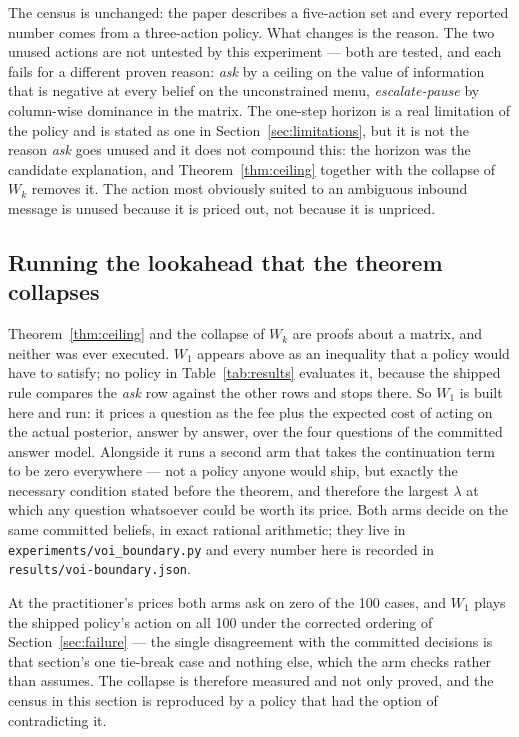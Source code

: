 \documentclass{article}
\begin{document}
The census is unchanged: the paper describes a five-action set and every reported
number comes from a three-action policy. What changes is the reason. The two unused
actions are not untested by this experiment --- both are tested, and each fails for
a different proven reason: \emph{ask} by a ceiling on the value of information that
is negative at every belief on the unconstrained menu, \emph{escalate-pause} by
column-wise dominance in the matrix. The one-step horizon is a real limitation of
the policy and is stated as one in Section~\ref{sec:limitations}, but it is not the
reason \emph{ask} goes unused and it does not compound this: the horizon was the
candidate explanation, and Theorem~\ref{thm:ceiling} together with the collapse of
$W_k$ removes it. The action most obviously suited to an ambiguous inbound message
is unused because it is priced out, not because it is unpriced.

\subsection{Running the lookahead that the theorem collapses}
\label{sec:boundary}
Theorem~\ref{thm:ceiling} and the collapse of $W_k$ are proofs about a matrix, and
neither was ever executed. $W_1$ appears above as an inequality that a policy would
have to satisfy; no policy in Table~\ref{tab:results} evaluates it, because the
shipped rule compares the \emph{ask} row against the other rows and stops there. So
$W_1$ is built here and run: it prices a question as the fee plus the expected cost
of acting on the actual posterior, answer by answer, over the four questions of the
committed answer model. Alongside it runs a second arm that takes the continuation
term to be zero everywhere --- not a policy anyone would ship, but exactly the
necessary condition stated before the theorem, and therefore the largest $\lambda$ at
which any question whatsoever could be worth its price. Both arms decide on the same
committed beliefs, in exact rational arithmetic; they live in
\texttt{experiments/voi\_boundary.py} and every number here is recorded in
\texttt{results/voi-boundary.json}.

At the practitioner's prices both arms ask on zero of the 100 cases, and $W_1$ plays
the shipped policy's action on all 100 under the corrected ordering of
Section~\ref{sec:failure} --- the single disagreement with the committed decisions is
that section's one tie-break case and nothing else, which the arm checks rather than
assumes. The collapse is therefore measured and not only proved, and the census in
this section is reproduced by a policy that had the option of contradicting it.
\end{document}
